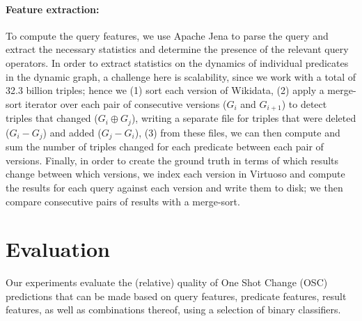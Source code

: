 \documentclass[runningheads]{llncs}
\begin{document}
\paragraph{Feature extraction:} To compute the query features, we use Apache Jena to parse the query and extract the necessary statistics and determine the presence of the relevant query operators. In order to extract statistics on the dynamics of individual predicates in the dynamic graph, a challenge here is scalability, since we work with a total of 32.3 billion triples; hence we (1) sort each version of Wikidata, (2) apply a merge-sort iterator over each pair of consecutive versions ($G_i$ and $G_{i+1}$) to detect triples that changed ($G_i \oplus G_j$), writing a separate file for triples that were deleted ($G_i - G_j$) and added ($G_j - G_i$), (3) from these files, we can then compute and sum the number of triples changed for each predicate between each pair of versions. Finally, in order to create the ground truth in terms of which results change between which versions, we index each version in Virtuoso and compute the results for each query against each version and write them to disk; we then compare consecutive pairs of results with a merge-sort.


\section{Evaluation}
\label{sec:eval}

%

Our experiments evaluate the (relative) quality of One Shot Change (OSC) predictions that can be made based on query features, predicate features, result features, as well as combinations thereof, using a selection of binary classifiers.
\end{document}
